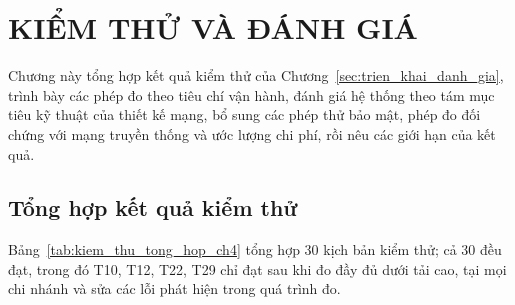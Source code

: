 \section{KIỂM THỬ VÀ ĐÁNH GIÁ}\label{sec:kiem_thu_danh_gia}

Chương này tổng hợp kết quả kiểm thử của Chương~\ref{sec:trien_khai_danh_gia}, trình bày các phép đo theo tiêu chí vận hành, đánh giá hệ thống theo tám mục tiêu kỹ thuật của thiết kế mạng, bổ sung các phép thử bảo mật, phép đo đối chứng với mạng truyền thống và ước lượng chi phí, rồi nêu các giới hạn của kết quả.

\subsection{Tổng hợp kết quả kiểm thử}

Bảng~\ref{tab:kiem_thu_tong_hop_ch4} tổng hợp 30 kịch bản kiểm thử; cả 30 đều đạt, trong đó T10, T12, T22, T29 chỉ đạt sau khi đo đầy đủ dưới tải cao, tại mọi chi nhánh và sửa các lỗi phát hiện trong quá trình đo.

